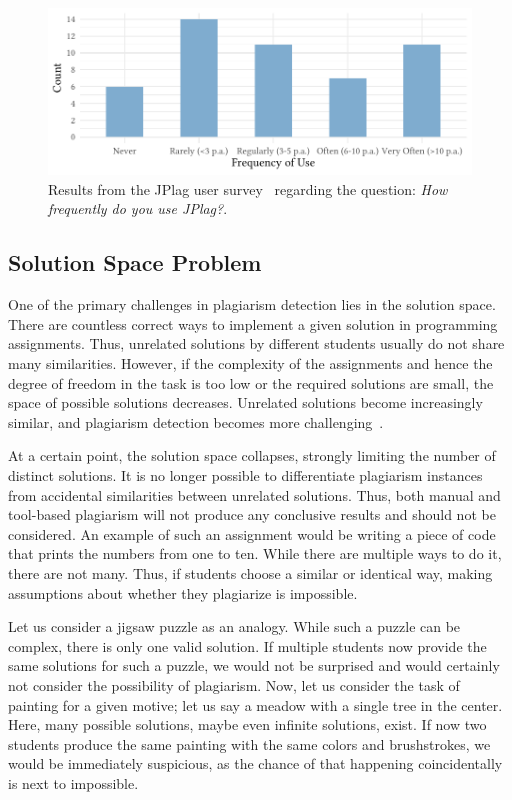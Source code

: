\begin{figure}[p]
\centering
\includegraphics[width=\linewidth]{figures/survey/survey-frequency.pdf}
\caption[JPlag Survey: Usage Frequency]{Results from the JPlag user survey~\cite{JPlagSurvey2024} regarding the question: \textit{How frequently do you use JPlag?}.}
\label{fig:survey-frequency}
\end{figure}

\subsection{Solution Space Problem}\label{sec:SPD-problem}
One of the primary challenges in plagiarism detection lies in the solution space. There are countless correct ways to implement a given solution in programming assignments. 
Thus, unrelated solutions by different students usually do not share many similarities. However, if the complexity of the assignments and hence the degree of freedom in the task is too low or the required solutions are small, the space of possible solutions decreases. Unrelated solutions become increasingly similar, and plagiarism detection becomes more challenging~\cite{Saglam2024b}.

At a certain point, the solution space collapses, strongly limiting the number of distinct solutions. It is no longer possible to differentiate plagiarism instances from accidental similarities between unrelated solutions. Thus, both manual and tool-based plagiarism will not produce any conclusive results and should not be considered.
An example of such an assignment would be writing a piece of code that prints the numbers from one to ten. While there are multiple ways to do it, there are not many. Thus, if students choose a similar or identical way, making assumptions about whether they plagiarize is impossible.

Let us consider a jigsaw puzzle as an analogy. While such a puzzle can be complex, there is only one valid solution. If multiple students now provide the same solutions for such a puzzle, we would not be surprised and would certainly not consider the possibility of plagiarism.
Now, let us consider the task of painting for a given motive; let us say a meadow with a single tree in the center. Here, many possible solutions, maybe even infinite solutions, exist. If now two students produce the same painting with the same colors and brushstrokes, we would be immediately suspicious, as the chance of that happening coincidentally is next to impossible.

